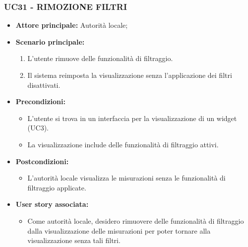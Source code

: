 \subsubsection{UC31 - RIMOZIONE FILTRI}
\begin{itemize}
    \item \textbf{Attore principale:} Autorità locale;
    \item \textbf{Scenario principale:}
          \begin{enumerate}
              \item L'utente rimuove delle funzionalità di filtraggio.
              \item Il sistema reimposta la visualizzazione senza l'applicazione dei filtri disattivati.
          \end{enumerate}
    \item \textbf{Precondizioni:}
          \begin{itemize}
              \item  L'utente si trova in un interfaccia per la visualizzazione di un widget (UC3).
              \item La visualizzazione include delle funzionalità di filtraggio attivi.
          \end{itemize}
    \item \textbf{Postcondizioni:}
          \begin{itemize}
              \item  L'autorità locale visualizza le misurazioni senza le funzionalità di filtraggio applicate.
          \end{itemize}
    \item \textbf{User story associata:}
          \begin{itemize}
            \item Come autorità locale, desidero rimuovere delle funzionalità di filtraggio dalla visualizzazione delle misurazioni per poter tornare alla visualizzazione senza tali filtri.
          \end{itemize}
\end{itemize}
